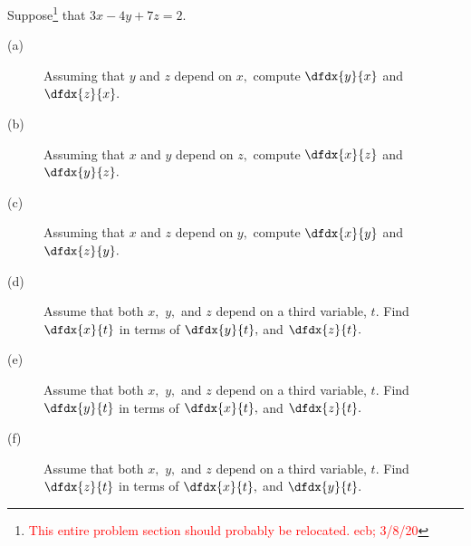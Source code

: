 \begin{ProblemSection}

\begin{embeddedproblem}{}
    Suppose\footnote{\textcolor{red}{This entire problem section
        should probably be relocated. ecb; 3/8/20}} that \(3x-4y+7z=2.\)
        \begin{description}
        \item[(a)] Assuming that $y$ and $z$ depend on $x,$ compute
          $\dfdx{y}{x}$ and $\dfdx{z}{x}.$
        \item[(b)] Assuming that $x$ and $y$ depend on $z,$ compute
          $\dfdx{x}{z}$ and $\dfdx{y}{z}.$ 
        \item[(c)] Assuming that $x$ and $z$ depend on $y,$ compute
          $\dfdx{x}{y}$ and $\dfdx{z}{y}.$ 
        \item[(d)] Assume that both $x,$ $y,$ and $z$ depend on a third
          variable, $t.$ Find $\dfdx{x}{t}$ in terms of $\dfdx{y}{t},$
          and $\dfdx{z}{t}.$
        \item[(e)] Assume that both $x,$ $y,$ and $z$ depend on a third
          variable, $t.$ Find $\dfdx{y}{t}$ in terms of $\dfdx{x}{t},$
          and $\dfdx{z}{t}.$
        \item[(f)] Assume that both $x,$ $y,$ and $z$ depend on a third
          variable, $t.$ Find $\dfdx{z}{t}$ in terms of $\dfdx{x}{t},$
          and $\dfdx{y}{t}.$
        \end{description}
  \end{embeddedproblem}


\end{ProblemSection}
